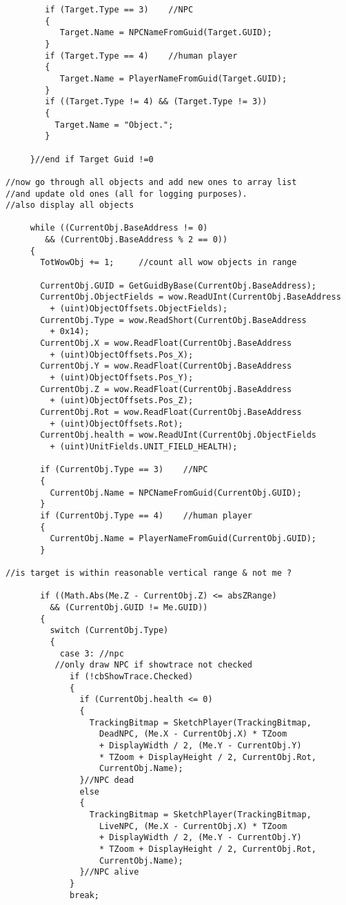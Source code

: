 \begin{lstlisting}
        if (Target.Type == 3)    //NPC 
        {
           Target.Name = NPCNameFromGuid(Target.GUID);
        }
        if (Target.Type == 4)    //human player
        {
           Target.Name = PlayerNameFromGuid(Target.GUID);
        }
        if ((Target.Type != 4) && (Target.Type != 3))
        {
          Target.Name = "Object.";
        }

     }//end if Target Guid !=0

//now go through all objects and add new ones to array list 
//and update old ones (all for logging purposes).
//also display all objects

     while ((CurrentObj.BaseAddress != 0) 
        && (CurrentObj.BaseAddress % 2 == 0))
     {
       TotWowObj += 1;     //count all wow objects in range

       CurrentObj.GUID = GetGuidByBase(CurrentObj.BaseAddress);
       CurrentObj.ObjectFields = wow.ReadUInt(CurrentObj.BaseAddress 
         + (uint)ObjectOffsets.ObjectFields);
       CurrentObj.Type = wow.ReadShort(CurrentObj.BaseAddress 
         + 0x14);
       CurrentObj.X = wow.ReadFloat(CurrentObj.BaseAddress 
         + (uint)ObjectOffsets.Pos_X);
       CurrentObj.Y = wow.ReadFloat(CurrentObj.BaseAddress 
         + (uint)ObjectOffsets.Pos_Y);
       CurrentObj.Z = wow.ReadFloat(CurrentObj.BaseAddress 
         + (uint)ObjectOffsets.Pos_Z);
       CurrentObj.Rot = wow.ReadFloat(CurrentObj.BaseAddress 
         + (uint)ObjectOffsets.Rot);
       CurrentObj.health = wow.ReadUInt(CurrentObj.ObjectFields 
         + (uint)UnitFields.UNIT_FIELD_HEALTH);

       if (CurrentObj.Type == 3)    //NPC 
       {
         CurrentObj.Name = NPCNameFromGuid(CurrentObj.GUID);
       }
       if (CurrentObj.Type == 4)    //human player
       {
         CurrentObj.Name = PlayerNameFromGuid(CurrentObj.GUID);
       }

//is target is within reasonable vertical range & not me ? 

       if ((Math.Abs(Me.Z - CurrentObj.Z) <= absZRange) 
         && (CurrentObj.GUID != Me.GUID))         
       {                                                                                                                          
         switch (CurrentObj.Type)
         {
           case 3: //npc
          //only draw NPC if showtrace not checked
             if (!cbShowTrace.Checked)   
             {
               if (CurrentObj.health <= 0)
               {
                 TrackingBitmap = SketchPlayer(TrackingBitmap, 
                   DeadNPC, (Me.X - CurrentObj.X) * TZoom 
                   + DisplayWidth / 2, (Me.Y - CurrentObj.Y) 
                   * TZoom + DisplayHeight / 2, CurrentObj.Rot, 
                   CurrentObj.Name);
               }//NPC dead
               else
               {
                 TrackingBitmap = SketchPlayer(TrackingBitmap, 
                   LiveNPC, (Me.X - CurrentObj.X) * TZoom 
                   + DisplayWidth / 2, (Me.Y - CurrentObj.Y) 
                   * TZoom + DisplayHeight / 2, CurrentObj.Rot, 
                   CurrentObj.Name);
               }//NPC alive
             }                                
             break;


\end{lstlisting}
